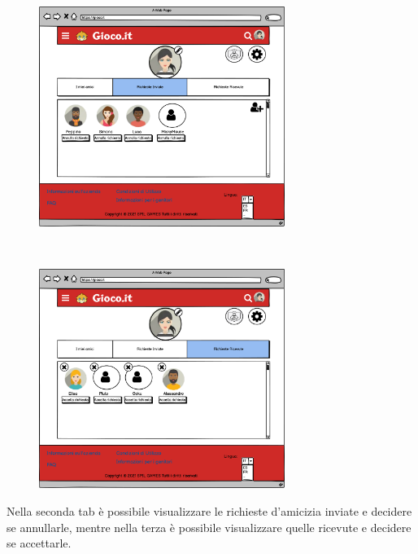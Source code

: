 \documentclass[../Report.tex]{subfiles}
\begin{document}
    \begin{figure}[H]
        \hspace{-1.5cm}
        \begin{minipage}[b]{8cm}
            \centering
            \includegraphics[width=8cm]{WAmici2.png}
            \end{minipage}
            \ \hspace{2mm} \hspace{3mm} \
            \begin{minipage}[b]{8cm}
            \centering
            \includegraphics[width=8cm]{WAmici3.png}
        \end{minipage}
    \end{figure}

    Nella seconda tab è possibile visualizzare le richieste d'amicizia inviate e decidere se annullarle, mentre nella terza è possibile visualizzare quelle ricevute e decidere se accettarle.
\end{document}
